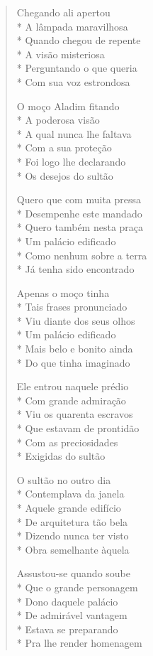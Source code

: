 \begin{verse}
Chegando ali apertou\\*
A lâmpada maravilhosa\\*
Quando chegou de repente\\*
A visão misteriosa\\*
Perguntando o que queria\\*
Com sua voz estrondosa

O moço Aladim fitando\\*
A poderosa visão\\*
A qual nunca lhe faltava\\*
Com a sua proteção\\*
Foi logo lhe declarando\\*
Os desejos do sultão

Quero que com muita pressa\\*
Desempenhe este mandado\\*
Quero também nesta praça\\*
Um palácio edificado\\*
Como nenhum sobre a terra\\*
Já tenha sido encontrado

Apenas o moço tinha\\*
Tais frases pronunciado\\*
Viu diante dos seus olhos\\*
Um palácio edificado\\*
Mais belo e bonito ainda\\*
Do que tinha imaginado

Ele entrou naquele prédio\\*
Com grande admiração\\*
Viu os quarenta escravos\\*
Que estavam de prontidão\\*
Com as preciosidades\\*
Exigidas do sultão

O sultão no outro dia\\*
Contemplava da janela\\*
Aquele grande edifício\\*
De arquitetura tão bela\\*
Dizendo nunca ter visto\\*
Obra semelhante àquela

Assustou-se quando soube\\*
Que o grande personagem\\*
Dono daquele palácio\\*
De admirável vantagem\\*
Estava se preparando\\*
Pra lhe render homenagem


\end{verse}
